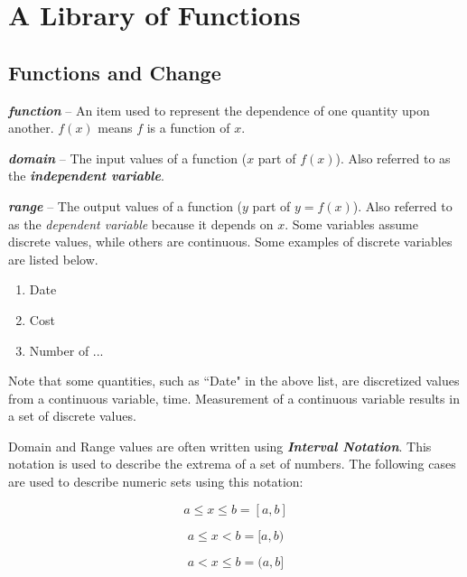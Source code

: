 \chapter{A Library of Functions}
\section{Functions and Change}

\textbf{\textit{function}} -- An item used to represent the dependence of one quantity upon another. $f(x)$ means $f$ is a function of $x$.

\textbf{\textit{domain}} -- The input values of a function ($x$ part of $f(x)$). Also referred to as the \textbf{\textit{independent variable}}.

\textbf{\textit{range}} -- The output values of a function ($y$ part of $y = f(x)$). Also referred to as the \textit{dependent variable} because it depends on $x$.
\vspace{0.1in}
Some variables assume discrete values, while others are continuous. Some examples of discrete variables are listed below.
\begin{enumerate}
\item Date\\
\vspace{-0.25in}
\item Cost\\
\vspace{-0.25in}
\item Number of ...
\end{enumerate}

Note that some quantities, such as ``Date" in the above list, are discretized values from a continuous variable, time. Measurement of a continuous variable results in a set of discrete values.

\vspace{0.1in}
Domain and Range values are often written using \textbf{\textit{Interval Notation}}. This notation is used to describe the extrema of a set of numbers. The following cases are used to describe numeric sets using this notation:

\begin{equation}
a \leq x \leq b = [a, b]
\end{equation}

\begin{equation}
a \leq x < b = [a, b)
\end{equation}

\begin{equation}
a < x \leq b = (a, b]
\end{equation}

